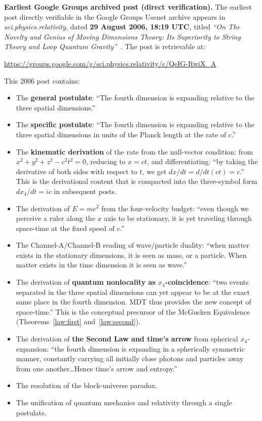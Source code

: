 \documentclass[11pt,a4paper]{article}
\begin{document}
\textbf{Earliest Google Groups archived post (direct verification).} The earliest post directly verifiable in the Google Groups Usenet archive appears in \emph{sci.physics.relativity}, dated \textbf{29 August 2006, 18:19 UTC}, titled \emph{``On The Novelty and Genius of Moving Dimensions Theory: Its Superiority to String Theory and Loop Quantum Gravity''}~\cite{mcgucken2006usenet}. The post is retrievable at:
\begin{center}
\url{https://groups.google.com/g/sci.physics.relativity/c/QeIG-RwiX_A}
\end{center}
This 2006 post contains:
\begin{itemize}
\item The \textbf{general postulate}: ``The fourth dimension is expanding relative to the three spatial dimensions.''
\item The \textbf{specific postulate}: ``The fourth dimension is expanding relative to the three spatial dimensions in units of the Planck length at the rate of $c$.''
\item The \textbf{kinematic derivation} of the rate from the null-vector condition: from $x^2 + y^2 + z^2 - c^2 t^2 = 0$, reducing to $x = ct$, and differentiating: ``by taking the derivative of both sides with respect to $t$, we get $dx/dt = d/dt(ct) = c$.'' This is the derivational content that is compacted into the three-symbol form $dx_4/dt = ic$ in subsequent posts.
\item The derivation of $E = mc^2$ from the four-velocity budget: ``even though we perceive a ruler along the $x$ axis to be stationary, it is yet traveling through space-time at the fixed speed of $c$.''
\item The Channel-A/Channel-B reading of wave/particle duality: ``when matter exists in the stationary dimensions, it is seen as mass, or a particle. When matter exists in the time dimension it is seen as wave.''
\item The derivation of \textbf{quantum nonlocality as $x_4$-coincidence}: ``two events separated in the three spatial dimensions can yet appear to be at the exact same place in the fourth dimension. MDT thus provides the new concept of space-time.'' This is the conceptual precursor of the McGucken Equivalence (Theorems~\ref{law:first} and~\ref{law:second}).
\item The derivation of \textbf{the Second Law and time's arrow} from spherical $x_4$-expansion: ``the fourth dimension is expanding in a spherically symmetric manner, constantly carrying all initially close photons and particles away from one another\ldots Hence time's arrow and entropy.''
\item The resolution of the block-universe paradox.
\item The unification of quantum mechanics and relativity through a single postulate.
\end{itemize}
\end{document}
